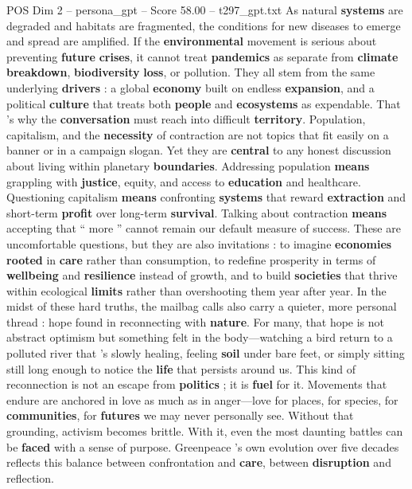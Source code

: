 \begin{textsample}{POS Dim 2 – persona\_gpt – Score 58.00 – t297\_gpt.txt}
As natural \textbf{systems} are degraded and habitats are fragmented, the conditions for new diseases to emerge and spread are amplified.
If the \textbf{environmental} movement is serious about preventing \textbf{future} \textbf{crises}, it cannot treat \textbf{pandemics} as separate from \textbf{climate} \textbf{breakdown}, \textbf{biodiversity} \textbf{loss}, or pollution.
They all stem from the same underlying \textbf{drivers} : a global \textbf{economy} built on endless \textbf{expansion}, and a political \textbf{culture} that treats both \textbf{people} and \textbf{ecosystems} as expendable.
That ’s why the \textbf{conversation} must reach into difficult \textbf{territory}.
Population, capitalism, and the \textbf{necessity} of contraction are not topics that fit easily on a banner or in a campaign slogan.
Yet they are \textbf{central} to any honest discussion about living within planetary \textbf{boundaries}.
Addressing population \textbf{means} grappling with \textbf{justice}, equity, and access to \textbf{education} and healthcare.
Questioning capitalism \textbf{means} confronting \textbf{systems} that reward \textbf{extraction} and short-term \textbf{profit} over long-term \textbf{survival}.
Talking about contraction \textbf{means} accepting that “ more ” cannot remain our default measure of success.
These are uncomfortable questions, but they are also invitations : to imagine \textbf{economies} \textbf{rooted} in \textbf{care} rather than consumption, to redefine prosperity in terms of \textbf{wellbeing} and \textbf{resilience} instead of growth, and to build \textbf{societies} that thrive within ecological \textbf{limits} rather than overshooting them year after year.
In the midst of these hard truths, the mailbag calls also carry a quieter, more personal thread : hope found in reconnecting with \textbf{nature}.
For many, that hope is not abstract optimism but something felt in the body—watching a bird return to a polluted river that ’s slowly healing, feeling \textbf{soil} under bare feet, or simply sitting still long enough to notice the \textbf{life} that persists around us.
This kind of reconnection is not an escape from \textbf{politics} ; it is \textbf{fuel} for it.
Movements that endure are anchored in love as much as in anger—love for places, for species, for \textbf{communities}, for \textbf{futures} we may never personally see.
Without that grounding, activism becomes brittle.
With it, even the most daunting battles can be \textbf{faced} with a sense of purpose.
Greenpeace ’s own evolution over five decades reflects this balance between confrontation and \textbf{care}, between \textbf{disruption} and reflection.

\end{textsample}
